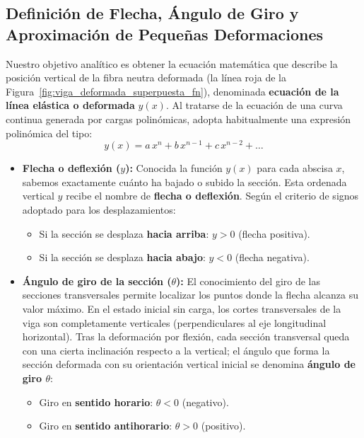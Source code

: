 \subsection{Definición de Flecha, Ángulo de Giro y Aproximación de Pequeñas Deformaciones}

Nuestro objetivo analítico es obtener la ecuación matemática que describe la posición vertical de la fibra neutra deformada (la línea roja de la Figura~\ref{fig:viga_deformada_superpuesta_fn}), denominada \textbf{ecuación de la línea elástica o deformada} $y(x)$. Al tratarse de la ecuación de una curva continua generada por cargas polinómicas, adopta habitualmente una expresión polinómica del tipo:
\begin{equation}
    y(x) = a\,x^n + b\,x^{n-1} + c\,x^{n-2} + \dots
\end{equation}

\begin{itemize}
    \item \textbf{Flecha o deflexión ($y$):} Conocida la función $y(x)$ para cada abscisa $x$, sabemos exactamente cuánto ha bajado o subido la sección. Esta ordenada vertical $y$ recibe el nombre de \textbf{flecha o deflexión}. Según el criterio de signos adoptado para los desplazamientos:
          \begin{itemize}
              \item Si la sección se desplaza \textbf{hacia arriba}: $y > 0$ (flecha positiva).
              \item Si la sección se desplaza \textbf{hacia abajo}: $y < 0$ (flecha negativa).
          \end{itemize}
    \item \textbf{Ángulo de giro de la sección ($\theta$):} El conocimiento del giro de las secciones transversales permite localizar los puntos donde la flecha alcanza su valor máximo. En el estado inicial sin carga, los cortes transversales de la viga son completamente verticales (perpendiculares al eje longitudinal horizontal). Tras la deformación por flexión, cada sección transversal queda con una cierta inclinación respecto a la vertical; el ángulo que forma la sección deformada con su orientación vertical inicial se denomina \textbf{ángulo de giro $\theta$}:
          \begin{itemize}
              \item Giro en \textbf{sentido horario}: $\theta < 0$ (negativo).
              \item Giro en \textbf{sentido antihorario}: $\theta > 0$ (positivo).
          \end{itemize}
\end{itemize}

